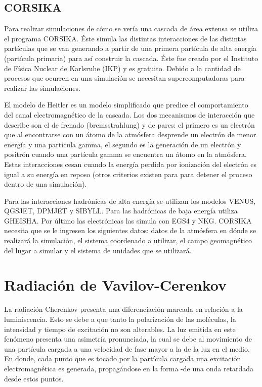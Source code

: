 \documentclass{book}
\begin{document}
\subsection{CORSIKA}
Para realizar simulaciones de cómo se vería una cascada de área extensa se utiliza el programa CORSIKA. Éste simula las distintas interacciones de las distintas partículas que se van generando a partir de una primera partícula de alta energía (partícula primaria) para así construir la cascada. Éste fue creado por el Instituto de Física Nuclear de Karlsruhe (IKP) y es gratuito. Debido a la cantidad de procesos que ocurren en una simulación se necesitan supercomputadoras para realizar las simulaciones. \citep{HECK}

El modelo de Heitler es un modelo simplificado que predice el comportamiento del canal electromagnético de la cascada. Los dos mecanismos de interacción que describe son el de frenado (bremsstrahlung) y de pares: el primero es un electrón que al encontrarse con un átomo de la atmósfera desprende un electrón de menor energía y una partícula gamma, el segundo es la generación de un electrón y positrón cuando una partícula gamma se encuentra un átomo en la atmósfera. Estas interacciones cesan cuando la energía perdida por ionización del electrón es igual a su energía en reposo (otros criterios existen para para detener el proceso dentro de una simulación). \citep{SUAREZ}

Para las interacciones hadrónicas de alta energía se utilizan los modelos VENUS, QGSJET, DPMJET y SIBYLL. Para las hadrónicas de baja energía utiliza GHEISHA. Por último las electrónicas las simula con EGS4 y NKG. CORSIKA necesita que se le ingresen los siguientes datos: datos de la atmósfera en dónde se realizará la simulación, el sistema coordenado a utilizar, el campo geomagnético del lugar a simular y el sistema de unidades que se utilizará. \citep{HECK}

\section{Radiaci\'on de Vavilov-Cerenkov}
La radiaci\'on Cherenkov presenta una diferenciaci\'on marcada en relaci\'on a la luminiscencia. Esto se debe a que tanto la polarizaci\'on de las mol\'eculas, la intensidad y tiempo de excitaci\'on no son alterables.  La luz emitida en este fen\'omeno presenta una asimetr\'ia pronunciada, la cual se debe al movimiento de una part\'icula cargada a una velocidad de fase mayor a la de la luz en el medio. En donde, cada punto que es tocado por la part\'icula cargada una excitaci\'on electromagn\'etica es generada, propag\'andose en la forma -de una onda retardada desde estos puntos.  \citep{CHERENKOV}
\end{document}
